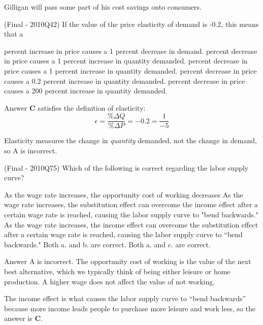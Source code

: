 \documentclass{exam}
\begin{document}
\begin{questions}
\begin{solution} Gilligan will pass some part of his cost savings onto consumers. \end{solution}

\question (Final - 2010Q42) If the value of the price elasticity of demand is -0.2, this means that a
\begin{choices}
 percent increase in price causes a 1 percent decrease in demand.
 percent decrease in price causes a 1 percent increase in quantity demanded.
 percent decrease in price causes a 1 percent increase in quantity demanded.
 percent decrease in price causes a 0.2 percent increase in quantity demanded.
 percent decrease in price causes a 200 percent increase in quantity demanded.
\end{choices}

\begin{solution} Answer $\textbf{C}$ satisfies the definition of elasticity: $$\epsilon = \frac{\%\Delta Q}{\%\Delta P} = -0.2 = \frac{1}{-5}$$

Elasticity measures the change in \textit{quantity} demanded, not the change in demand, so A is incorrect.
\end{solution}

\question (Final - 2010Q75) Which of the following is correct regarding the labor supply curve?
\begin{choices}
\choice As the wage rate increases, the opportunity cost of working decreases
\choice As the wage rate increases, the substitution effect can overcome the income effect after a certain
wage rate is reached, causing the labor supply curve to "bend backwards." 
\CorrectChoice As the wage rate increases, the income effect can overcome the substitution effect after a certain
wage rate is reached, causing the labor supply curve to ``bend backwards." 
\choice Both a. and b. are correct. 
\choice Both a. and c. are correct. 
\end{choices}

\begin{solution} Answer A is incorrect. The opportunity cost of working is the value of the next best alternative, which we typically think of being either leisure or home production. A higher wage does not affect the value of not working.

The income effect is what causes the labor supply curve to ``bend backwards'' because more income leads people to purchase more leisure and work less, so the answer is \textbf{C}. \end{solution}


\end{questions}
\end{document}

